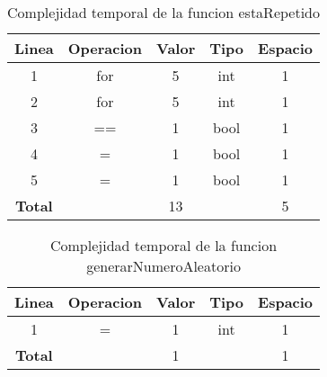 \documentclass[10pt,twocolumn]{article}
\begin{document}
\begin{table}[h]
\centering
\begin{tabular}{|c|c|c|c|c|}
\hline
\textbf{Linea} & \textbf{Operacion} & \textbf{Valor} & \textbf{Tipo} & \textbf{Espacio} \\
\hline
1 & for & 5 & int & 1 \\
2 & for & 5 & int & 1 \\
3 & == & 1 & bool & 1 \\
4 & = & 1 & bool & 1 \\
5 & = & 1 & bool & 1 \\
\hline
\textbf{Total} &  & 13 &  & 5 \\
\hline
\end{tabular}
\caption{Complejidad temporal de la funcion estaRepetido}
\label{tablaComplejidadEstaRepetido}
\end{table}






\begin{table}[h]
\centering
\begin{tabular}{|c|c|c|c|c|}
\hline
\textbf{Linea} & \textbf{Operacion} & \textbf{Valor} & \textbf{Tipo} & \textbf{Espacio} \\
\hline
1 & = & 1 & int & 1 \\
\hline
\textbf{Total} &  & 1 &  & 1 \\
\hline
\end{tabular}
\caption{Complejidad temporal de la funcion generarNumeroAleatorio}
\label{tablaComplejidadGenerarNumeroAleatorio}
\end{table}
\end{document}
